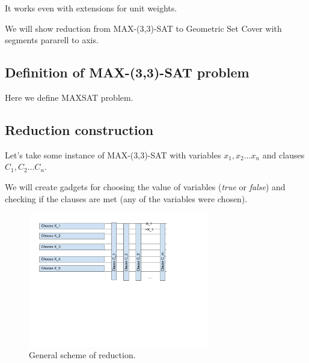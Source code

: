 It works even with extensions for unit weights.

We will show reduction from MAX-(3,3)-SAT
to Geometric Set Cover with segments pararell to axis.

\subsection{Definition of  MAX-(3,3)-SAT problem}
Here we define MAXSAT problem.

\subsection{Reduction construction}

Let's take some instance of  MAX-(3,3)-SAT with
variables $x_1, x_2 \ldots x_n$
and clauses $C_1, C_2 \dots C_n$.

We will create gadgets for choosing the value
of variables (\textit{true} or \textit{false}) and checking
if the clauses are met (any of the variables were chosen).

\begin{figure}[h]
\includegraphics[width=0.7\textwidth]{segment_apx_sketch.jpg}
\caption{General scheme of reduction.}
\label{fig:segment_apx}
\end{figure}

